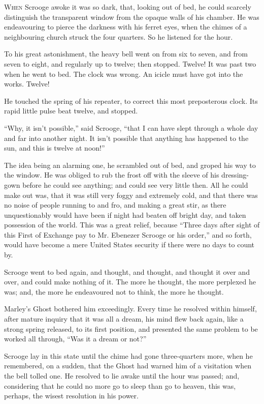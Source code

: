 \documentclass[paper=a5,BCOR=15mm,twoside,DIV=15,headinclude=off,12pt,chapterprefix=off,openany,headings=huge]{scrbook} %
\begin{document}
\lettrine[loversize=.85]{W}{hen} Scrooge awoke it was so dark, that, looking out of bed, he could scarcely distinguish the transparent window from the opaque walls of his chamber. He was endeavouring to pierce the darkness with his ferret eyes, when the chimes of a neighbouring church struck the four quarters. So he listened for the hour.

To his great astonishment, the heavy bell went on from six to seven, and from seven to eight, and regularly up to twelve; then stopped. Twelve! It was past two when he went to bed. The clock was wrong. An icicle must have got into the works. Twelve!

He touched the spring of his repeater, to correct this most preposterous clock. Its rapid little pulse beat twelve, and stopped.

\enquote{Why, it isn't possible,} said Scrooge, \enquote{that I can have slept through a whole day and far into another night. It isn't possible that anything has happened to the sun, and this is twelve at noon!}

The idea being an alarming one, he scrambled out of bed, and groped his way to the window. He was obliged to rub the frost off with the sleeve of his dressing-gown before he could see anything; and could see very little then. All he could make out was, that it was still very foggy and extremely cold, and that there was no noise of people running to and fro, and making a great stir, as there unquestionably would have been if night had beaten off bright day, and taken possession of the world. This was a great relief, because \enquote{Three days after sight of this First of Exchange pay to Mr. Ebenezer Scrooge or his order,} and so forth, would have become a mere United States security if there were no days to count by.

Scrooge went to bed again, and thought, and thought, and thought it over and over, and could make nothing of it. The more he thought, the more perplexed he was; and, the more he endeavoured not to think, the more he thought.

Marley's Ghost bothered him exceedingly. Every time he resolved within himself, after mature inquiry that it was all a dream, his mind flew back again, like a strong spring released, to its first position, and presented the same problem to be worked all through, \enquote{Was it a dream or not?}

Scrooge lay in this state until the chime had gone three-quarters more, when he remembered, on a sudden, that the Ghost had warned him of a visitation when the bell tolled one. He resolved to lie awake until the hour was passed; and, considering that he could no more go to sleep than go to heaven, this was, perhaps, the wisest resolution in his power.
\end{document}
